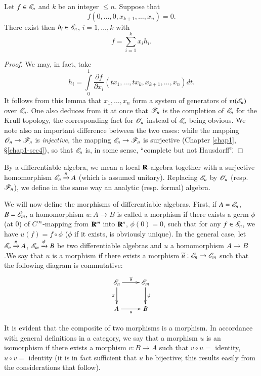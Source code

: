 \begin{lemma}\label{chap3-lem2.1}
Let $f\in \mathscr{E}_{n}$ and $k$ be an integer $\leq n$. Suppose that 
$$
f(0,\ldots,0,x_{k+1},\ldots,x_{n})=0.
$$
There exist then $h_{i}\in \mathscr{E}_{n}$, $i=1,\ldots,k$ with
$$
f=\sum\limits^{k}_{i=1}x_{i}h_{i}.
$$
\end{lemma}

\begin{proof}
We may, in fact, take
$$
h_{i}=\int\limits^{1}_{0}\dfrac{\partial f}{\partial x_{i}}(tx_{1},\ldots,tx_{k},x_{k+1},\ldots,x_{n})dt.
$$
It follows from this lemma that $x_{1},\ldots,x_{n}$ form a system of generators of $\mathfrak{m}(\mathscr{E}_{n})$ over $\mathscr{E}_{n}$. One also deduces from it at once that $\mathscr{F}_{n}$ is the completion of $\mathscr{E}_{n}$ for the Krull topology, the corresponding fact for $\mathscr{O}_{n}$ instead of $\mathscr{E}_{n}$ being obvious. We note also an important difference between the two cases: while the mapping $\mathscr{O}_{n}\to \mathscr{F}_{n}$ is {\em injective}, the mapping $\mathscr{E}_{n}\to \mathscr{F}_{n}$ is surjective (Chapter \ref{chap1}, \S\ref{chap1-sec4}), so that $\mathscr{E}_{n}$ is, in some sense, ``complete but not Hausdorff''.
\end{proof}

\begin{definition}\label{chap3-defi2.2}
By a differentiable algebra, we mean a local $\mathbf{R}$-algebra together with a surjective homomorphism $\mathscr{E}_{n}\xrightarrow{\pi}A$ (which is assumed unitary). Replacing $\mathscr{E}_{n}$ by $\mathscr{O}_{n}$ (resp. $\mathscr{F}_{n}$), we define in the same way an analytic (resp. formal) algebra.
\end{definition}

We will now define the morphisms of differentiable algebras. First, if $A=\mathscr{E}_{n}$, $B=\mathscr{E}_{m}$, a homomorphism $u:A\to B$ is called a morphism if there exists a germ $\phi$ (at 0) of $C^{\infty}$-mapping from $\mathbf{R}^{m}$ into $\mathbf{R}^{n}$, $\phi(0)=0$, such that for any $f\in \mathscr{E}_{n}$, we have $u(f)=f\circ \phi$ ($\phi$ if it exists, is obviously unique). In the general case, let $\mathscr{E}_{n}\xrightarrow{\pi}A$, $\mathscr{E}_{m}\xrightarrow{\psi}B$ be two differentiable algebras and $u$ a homomorphism $A\to B$.\pageoriginale We say that $u$ is a morphism if there exists a morphism $\widetilde{u}:\mathscr{E}_{n}\to \mathscr{E}_{m}$ such that the following diagram is commutative:
\[
\xymatrix{
\scrE_{n}\ar[d]_{\pi}\ar[r]^{\widetilde{u}} & \scrE_{m}\ar[d]^{\psi}\\
A\ar[r]_{u} & B
}
\]

It is evident that the composite of two morphisms is a morphism. In accordance with general definitions in a category, we say that a morphism $u$ is an isomorphism if there exists a morphism $v:B\to A$ such that $v\circ u=$ identity, $u\circ v=$ identity (it is in fact sufficient that $u$ be bijective; this results easily from the considerations that follow).

